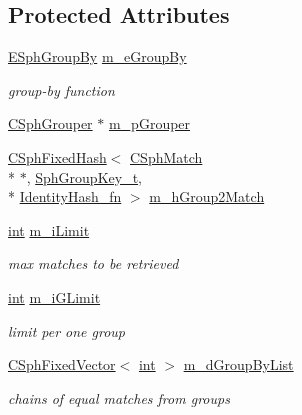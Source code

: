 \subsection*{Protected Attributes}
\begin{DoxyCompactItemize}
\item 
\hyperlink{sphinx_8h_a54472d41a76434c6d6535d438bc080bf}{E\-Sph\-Group\-By} \hyperlink{classCSphKBufferNGroupSorter_a41ad1421d5960fe4701ab2b9d5d93fa9}{m\-\_\-e\-Group\-By}
\begin{DoxyCompactList}\small\item\em group-\/by function \end{DoxyCompactList}\item 
\hyperlink{classCSphGrouper}{C\-Sph\-Grouper} $\ast$ \hyperlink{classCSphKBufferNGroupSorter_af29b813107bc037f605aae36be5cd895}{m\-\_\-p\-Grouper}
\item 
\hyperlink{classCSphFixedHash}{C\-Sph\-Fixed\-Hash}$<$ \hyperlink{classCSphMatch}{C\-Sph\-Match} \\*
$\ast$, \hyperlink{sphinxsort_8cpp_ab18dbc744a7e1518a776845191f194c8}{Sph\-Group\-Key\-\_\-t}, \\*
\hyperlink{structIdentityHash__fn}{Identity\-Hash\-\_\-fn} $>$ \hyperlink{classCSphKBufferNGroupSorter_a9b407b13fcdbd6a922effa1748ae5049}{m\-\_\-h\-Group2\-Match}
\item 
\hyperlink{sphinxexpr_8cpp_a4a26e8f9cb8b736e0c4cbf4d16de985e}{int} \hyperlink{classCSphKBufferNGroupSorter_a51168c4d12cf65a9674f1d5bcdf45946}{m\-\_\-i\-Limit}
\begin{DoxyCompactList}\small\item\em max matches to be retrieved \end{DoxyCompactList}\item 
\hyperlink{sphinxexpr_8cpp_a4a26e8f9cb8b736e0c4cbf4d16de985e}{int} \hyperlink{classCSphKBufferNGroupSorter_a9c0663323613d107bbfd847c56cf4e6b}{m\-\_\-i\-G\-Limit}
\begin{DoxyCompactList}\small\item\em limit per one group \end{DoxyCompactList}\item 
\hyperlink{classCSphFixedVector}{C\-Sph\-Fixed\-Vector}$<$ \hyperlink{sphinxexpr_8cpp_a4a26e8f9cb8b736e0c4cbf4d16de985e}{int} $>$ \hyperlink{classCSphKBufferNGroupSorter_a496bee0a01f257de6bbb52e42fe6ffb8}{m\-\_\-d\-Group\-By\-List}
\begin{DoxyCompactList}\small\item\em chains of equal matches from groups \end{DoxyCompactList}\item 

\end{DoxyCompactItemize}

